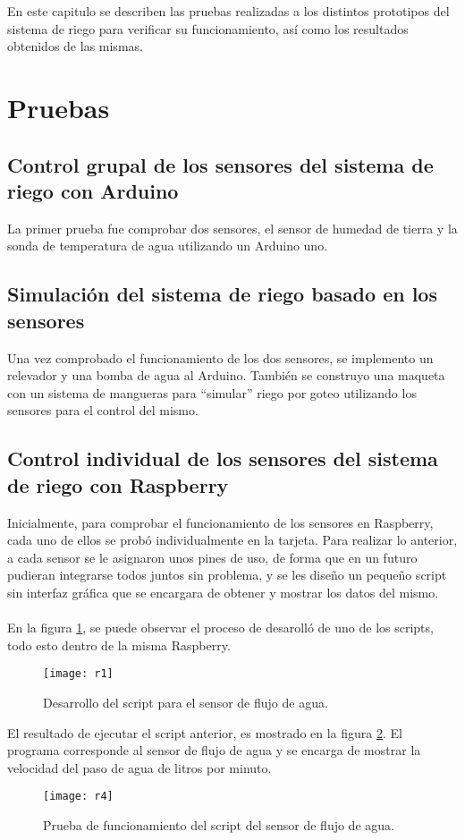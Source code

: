 En este capitulo se describen las pruebas realizadas a los distintos prototipos del sistema de riego para verificar su funcionamiento, as\'i como los resultados obtenidos de las mismas.

\section{Pruebas}
\subsection{Control grupal de los sensores del sistema de riego con Arduino}
La primer prueba fue comprobar dos sensores, el sensor de humedad de tierra y la sonda de temperatura de agua utilizando un Arduino uno.

\subsection{Simulaci\'on del sistema de riego basado en los sensores}
Una vez comprobado el funcionamiento de los dos sensores, se implemento un relevador y una bomba de agua al Arduino. Tambi\'en se construyo una maqueta con un sistema de mangueras para ``simular'' riego por goteo utilizando los sensores para el control del mismo.


\subsection{Control individual de los sensores del sistema de riego con Raspberry}
Inicialmente, para comprobar el funcionamiento de los sensores en Raspberry, cada uno de ellos se prob\'o individualmente en la tarjeta. Para realizar lo anterior, a cada sensor se le asignaron unos pines de uso, de forma que en un futuro pudieran integrarse todos juntos sin problema, y se les dise\~{n}o un peque\~{n}o script sin interfaz gr\'afica que se encargara de obtener y mostrar los datos del mismo.\\\\
En la figura \ref{r1}, se puede observar el proceso de desaroll\'o de uno de los scripts, todo esto dentro de la misma Raspberry.
\begin{figure}[H]
\begin{center}
	\texttt{[image: r1]}
\end{center}
	\caption{Desarrollo del script para el sensor de flujo de agua.}
	\label{r1}
\end{figure} 
El resultado de ejecutar el script anterior, es mostrado en la figura \ref{r4}. El programa corresponde al sensor de flujo de agua y se encarga de mostrar la velocidad del paso de agua de litros por minuto.
\begin{figure}[H]
	\begin{center}
		\texttt{[image: r4]}
	\end{center}
	\caption{Prueba de funcionamiento del script del sensor de flujo de agua.}
	\label{r4}
\end{figure} 

